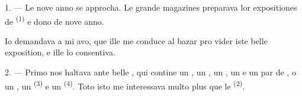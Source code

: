 %
%

\VUsaut{4.0mm}
\VUsaut{2.0mm}
\VUsaut{3.4mm}

1. --- Le nove anno se approcha. Le grande magazines preparava lor expositiones
de  \textsuperscript{(1)} e dono de nove anno.

Io demandava a mi avo, que ille me conduce al bazar pro vider iste belle
exposition, e ille lo consentiva.

2. --- Primo nos haltava ante belle , qui contine un
, un , un , un  e un par de , o un , un
 \textsuperscript{(3)} e un 
\textsuperscript{(4)}. Toto isto me interessava multo plus que le
 \textsuperscript{(2)}.

\VUsaut{3.0mm}
\VUsaut{2.6mm}

